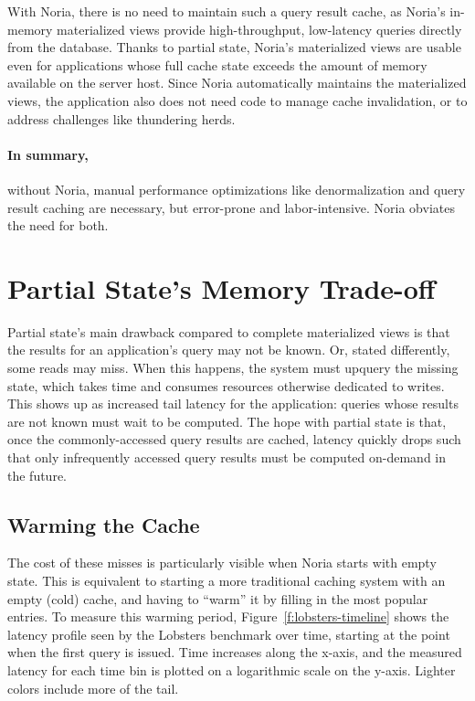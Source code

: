 With Noria, there is no need to maintain such a query result cache, as Noria's
in-memory materialized views provide high-throughput, low-latency queries
directly from the database. Thanks to partial state, Noria's materialized views
are usable even for applications whose full cache state exceeds the amount of
memory available on the server host. Since Noria automatically maintains the
materialized views, the application also does not need code to manage cache
invalidation, or to address challenges like thundering herds.

\paragraph{In summary,} without Noria, manual performance optimizations like
denormalization and query result caching are necessary, but error-prone and
labor-intensive. Noria obviates the need for both.

\section{Partial State's Memory Trade-off}
\label{s:eval:cost}

Partial state's main drawback compared to complete materialized views is
that the results for an application's query may not be known. Or, stated
differently, some reads may miss. When this happens, the system must upquery the
missing state, which takes time and consumes resources otherwise dedicated to
writes. This shows up as increased tail latency for the application: queries
whose results are not known must wait to be computed. The hope with partial
state is that, once the commonly-accessed query results are cached, latency
quickly drops such that only infrequently accessed query results must be
computed on-demand in the future.

\subsection{Warming the Cache}

The cost of these misses is particularly visible when Noria starts with empty
state. This is equivalent to starting a more traditional caching system with an
empty (cold) cache, and having to ``warm'' it by filling in the most popular
entries. To measure this warming period, Figure~\vref{f:lobsters-timeline} shows
the latency profile seen by the Lobsters benchmark over time, starting at the
point when the first query is issued. Time increases along the x-axis, and the
measured latency for each time bin is plotted on a logarithmic scale on the
y-axis. Lighter colors include more of the tail.

